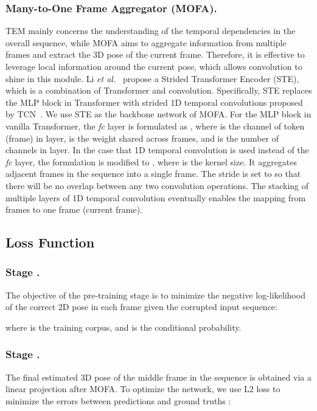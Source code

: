 \documentclass[]{llncs}
\newcommand{\RNum}[1]{\uppercase\expandafter{\romannumeral #1\relax}}
\begin{document}
\subsubsection{Many-to-One Frame Aggregator (MOFA).}
TEM mainly concerns the understanding of the temporal dependencies in the overall sequence, while MOFA aims to aggregate information from multiple frames and extract the 3D pose of the current frame. Therefore, it is effective to leverage local information around the current pose, which allows convolution to shine in this module. Li \textit{et al.}~\cite{li2022exploiting} propose a Strided Transformer Encoder (STE), which is a combination of Transformer and convolution. Specifically, STE replaces the MLP block in Transformer with strided 1D temporal convolutions proposed by TCN~\cite{pavllo20193d}. We use STE as the backbone network of MOFA. For the MLP block in vanilla Transformer, the \emph{fc} layer is formulated as , where  is the  channel of  token (frame) in  layer,  is the weight shared across frames, and  is the number of channels in  layer. In the case that 1D temporal convolution is used instead of the \emph{fc} layer, the formulation is modified to , where  is the kernel size. It aggregates adjacent  frames in the sequence into a single frame. The stride is set to  so that there will be no overlap between any two convolution operations. The stacking of multiple layers of 1D temporal convolution eventually enables the mapping from  frames to one frame (current frame).

\subsection{Loss Function}

\subsubsection{Stage \RNum{1}.}
The objective of the pre-training stage is to minimize the negative log-likelihood of the correct 2D pose  in each frame given the corrupted input sequence: 

where  is the training corpus, and  is the conditional probability.

\subsubsection{Stage \RNum{2}.}

The final estimated 3D pose of the middle frame in the sequence is obtained via a linear projection after MOFA. To optimize the network, we use L2 loss to minimize the errors between predictions and ground truths : 
\end{document}
